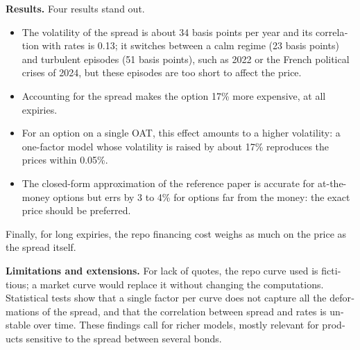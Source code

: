 \begin{otherlanguage}{english}
\textbf{Results.} Four results stand out.
\begin{itemize}
\item The volatility of the spread is about 34 basis points per year and its correlation with rates is 0.13; it
switches between a calm regime (23 basis points) and turbulent episodes (51 basis points), such as 2022 or the
French political crises of 2024, but these episodes are too short to affect the price.
\item Accounting for the spread makes the option 17\% more expensive, at all expiries.
\item For an option on a single OAT, this effect amounts to a higher volatility: a one-factor model whose
volatility is raised by about 17\% reproduces the prices within 0.05\%.
\item The closed-form approximation of the reference paper is accurate for at-the-money options but errs by 3
to 4\% for options far from the money: the exact price should be preferred.
\end{itemize}
Finally, for long expiries, the repo financing cost weighs as much on the price as the spread itself.

\textbf{Limitations and extensions.} For lack of quotes, the repo curve used is fictitious; a market curve would
replace it without changing the computations. Statistical tests show that a single factor per curve does not
capture all the deformations of the spread, and that the correlation between spread and rates is unstable over
time. These findings call for richer models, mostly relevant for products sensitive to the spread between
several bonds.
\end{otherlanguage}
